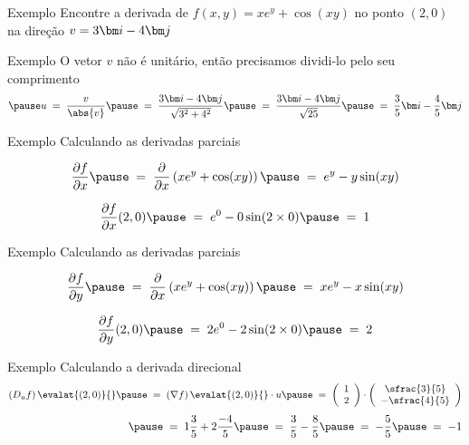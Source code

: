 \addtocounter{exemplo}{1}
\begin{frame}{Exemplo \theexemplo}
  Encontre a derivada de \(f(x, y) = xe^y + \cos(xy)\)
  no ponto \((2, 0)\)
  na direção \(v=3\veci-4\vecj\)
\end{frame}

\begin{frame}{Exemplo \theexemplo}
  O vetor $v$ não é unitário,
  \pause
  então precisamos dividi-lo pelo seu
  comprimento
  \[
    \pause
    u
    \;=\; \frac{v}{\abs{v}}
    \pause
    \;=\; \frac{3\veci-4\vecj}{\sqrt{3^2+4^2}}
    \pause
    \;=\; \frac{3\veci-4\vecj}{\sqrt{25}}
    \pause
    \;=\; \frac{3}{5}\veci - \frac{4}{5}\vecj
  \]
\end{frame}

\begin{frame}{Exemplo \theexemplo}
  Calculando as derivadas parciais

  \pause
  \[
    \D{f}{x}
    \pause
    \;=\;  \D{}{x}\left(xe^y + \cos(xy)\right)
    \pause
    \;=\;  e^y - y\sin(xy)
  \]

  \pause
  \[
    \D{f}{x}(2, 0)
    \pause
    \;=\;  e^0 - 0\sin(2\times 0)
    \pause
    \;=\;  1
  \]
\end{frame}

\begin{frame}{Exemplo \theexemplo}
  Calculando as derivadas parciais

  \pause
  \[
    \D{f}{y}
    \pause
    \;=\;  \D{}{x}\left(xe^y + \cos(xy)\right)
    \pause
    \;=\;  xe^y - x\sin(xy)
  \]

  \pause
  \[
    \D{f}{y}(2, 0)
    \pause
    \;=\;  2e^0 - 2\sin(2\times 0)
    \pause
    \;=\;  2
  \]
\end{frame}

\begin{frame}{Exemplo \theexemplo}
  Calculando a derivada direcional
  \[
    \left(D_u f\right)\evalat{(2, 0)}{}
    \pause
    \;=\; \left(\nabla f\right)\evalat{(2, 0)}{} \cdot u
    \pause
    \;=\; \vetor{1}{2} \cdot \vetor{\sfrac{3}{5}}{-\sfrac{4}{5}}
  \]
  \[
    \hphantom{\left(D_u f\right)\evalat{(2, 0)}{}}
    \pause
    \;=\; 1 \frac{3}{5} + 2 \frac{-4}{5}
    \pause
    \;=\; \frac{3}{5} - \frac{8}{5}
    \pause
    \;=\; - \frac{5}{5}
    \pause
    \;=\; -1
  \]
\end{frame}

